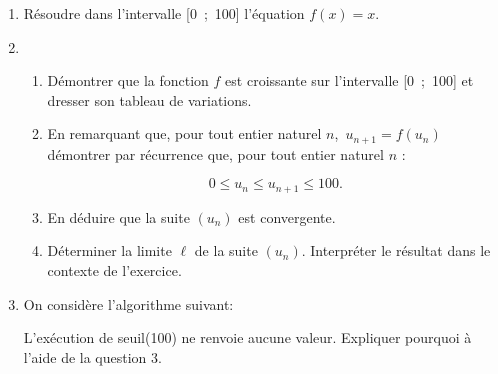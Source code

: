 \begin{enumerate}[resume]
	\item Résoudre dans l'intervalle [0~;~100] l'équation $f(x) = x$.
	\item
	      \begin{enumerate}
		      \item Démontrer que la fonction $f$ est croissante sur l'intervalle [0~;~100] et dresser son tableau de variations.
		      \item En remarquant que, pour tout entier naturel $n$,\, $u_{n+1} = f\left(u_n\right)$ démontrer par récurrence que, pour tout entier naturel $n$ :

		            \[0 \leqslant u_n \leqslant u_{n+1} \leqslant 100.\]

		      \item En déduire que la suite $\left(u_n\right)$ est convergente.
		      \item Déterminer la limite $\ell$ de la suite $\left(u_n\right)$. Interpréter le résultat dans le contexte de l'exercice.
	      \end{enumerate}
	\item On considère l'algorithme suivant:

	      \begin{center}
	      \end{center}

	      L'exécution de seuil(100) ne renvoie aucune valeur. Expliquer pourquoi à l'aide de la question 3.
\end{enumerate}



